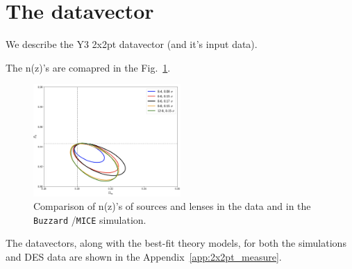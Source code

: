 \documentclass[fleqn,usenatbib]{mnras}
\newcommand{\mice}{\texttt{MICE} }
\newcommand{\buzzard}{\texttt{Buzzard} }
\begin{document}



    
    

 

\section{The datavector}
We describe the Y3 2x2pt datavector (and it's input data).

The n(z)'s are comapred in the Fig.~\ref{fig:nz_comp}.

\begin{figure}
\includegraphics[width=0.5\textwidth,draft]{figs/temp.png}
\caption[]{Comparison of n(z)'s of sources and lenses in the data and in the \buzzard/\mice simulation. }
\label{fig:nz_comp}
\end{figure}

The datavectors, along with the best-fit theory models, for both the simulations and DES data are shown in the Appendix~\ref{app:2x2pt_measure}. 
\end{document}

